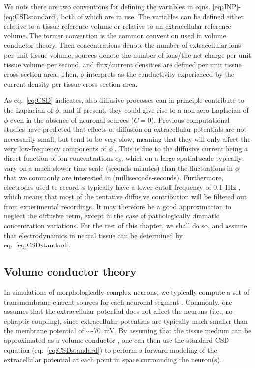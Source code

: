\documentclass[preprint,11pt,authoryear]{elsarticle}
\newcommand{\hlj}[2][OliveGreen]{ {\sethlcolor{#1} \hl{#2}} }
\newcommand{\hlp}[2][Purple]{ {\sethlcolor{#1} \hl{#2}} }
\newcommand{\tvnnote}[1]{\color{white}{\hlj{TVN: #1 }}\color{black}}
\newcommand{\snnote}[1]{\color{white}{\hlp{SN: #1 }}\color{black}}
\begin{document}
We note there are two conventions for defining the variables in eqns. \ref{eq:JNP}-\ref{eq:CSDstandard}, both of which are in use. The variables can be defined either relative to a tissue reference volume or relative to an extracellular reference volume. The former convention is the common convention used in volume conductor theory. Then concentrations denote the number of extracellular ions per unit tissue volume, sources denote the number of ions/the net charge per unit tissue volume per second, and flux/current densities are defined per unit tissue cross-section area. Then, $\sigma$ interprets as the conductivity experienced by the current density per tissue cross section area. 

As eq.~\ref{eq:CSD} indicates, also diffusive processes can in principle contribute to the Laplacian of $\phi$, and if present, they could give rise to a non-zero Laplacian of $\phi$ even in the absence of neuronal sources ($C = 0$). Previous computational studies have predicted that effects of diffusion on extracellular potentials are not necessarily small, but tend to be very slow, meaning that they will only affect the very low-frequency components of $\phi$ \citep{Halnes2016, Halnes2017}. This is due to the diffusive current being a direct function of ion concentrations $c_k$, which on a large spatial scale typically vary on a much slower time scale (seconds-minutes) than the fluctuations in $\phi$ that we commonly are interested in (milliseconds-seconds). Furthermore, electrodes used to record $\phi$ typically have a lower cutoff frequency of 0.1-1Hz \citep{Einevoll2013}, which means that most of the tentative diffusive contribution will be filtered out from experimental recordings. It may therefore be a good approximation to neglect the diffusive term, except in the case of pathologically dramatic concentration variations. For the rest of this chapter, we shall do so, and assume that electrodynamics in neural tissue can be determined by eq.~\ref{eq:CSDstandard}.




\subsection{Volume conductor theory}
\label{sec:VC_theory}
In simulations of morphologically complex neurons, we typically compute a set of transmembrane current sources for each neuronal segment \citep{Koch1999}. Commonly, one assumes that the extracellular potential does not affect the neurons (i.e., no ephaptic coupling), since extracellular potentials are typically much smaller than the membrane potential of $\sim$-70~mV. 
By assuming that the tissue medium can be approximated as a volume conductor \citep{Holt1999, Linden2014}, one can then use the standard CSD equation (eq.~\ref{eq:CSDstandard}) to perform a forward modeling of the extracellular potential at each point in space surrounding the neuron(s). 
\end{document}
